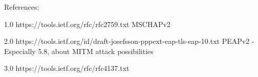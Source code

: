 \documentclass[oneside, final, 14pt]{extarticle}
\begin{document}
References:

1.0 https://tools.ietf.org/rfc/rfc2759.txt MSCHAPv2

2.0 https://tools.ietf.org/id/draft-josefsson-pppext-eap-tls-eap-10.txt PEAPv2
  - Especially 5.8, about MITM attack possibilities

3.0 https://tools.ietf.org/rfc/rfc4137.txt
\end{document}
